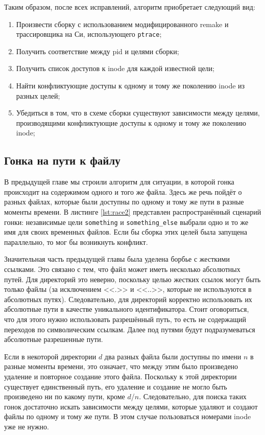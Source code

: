 Таким образом, после всех исправлений, алгоритм приобретает следующий вид:

\begin{enumerate}
	\item Произвести сборку с использованием модифицированного remake и трассировщика на Си, использующего \texttt{ptrace};
	\item Получить соответствие между pid и целями сборки;
	\item Получить список доступов к inode для каждой известной цели;
	\item Найти конфликтующие доступы к одному и тому же поколению inode из разных целей;
	\item Убедиться в том, что в схеме сборки существуют зависимости между целями, производящими конфликтующие доступы к одному и тому же поколению inode;
\end{enumerate}

\subsection{Гонка на пути к файлу}



В предыдущей главе мы строили алгоритм для ситуации, в которой гонка происходит на содержимом одного и того же файла. Здесь же речь пойдёт о разных файлах, которые были доступны по одному и тому же пути в разные моменты времени. В листинге \ref{lst:race2} представлен распространённый сценарий гонки: независимые цели \texttt{something} и \texttt{something\_else} выбрали одно и то же имя для своих временных файлов. Если бы сборка этих целей была запущена параллельно, то мог бы возникнуть конфликт.

Значительная часть предыдущей главы была уделена борбье с жесткими ссылками. Это связано с тем, что файл может иметь несколько абсолютных путей. Для директорий это неверно, поскольку целью жестких ссылок могут быть только файлы (за исключением <<.>> и <<..>>, которые не используются в абсолютных путях). Следовательно, для директорий корректно использовать их абсолютные пути в качестве уникального идентификатора. Стоит оговориться, что для этого нужно использовать разрешённый путь, то есть не содержащий переходов по символическим ссылкам. Далее под путями будут подразумеваться абсолютные разрешенные пути.

Если в некоторой директории $d$ два разных файла были доступны по имени $n$ в разные моменты времени, это означает, что между этим было произведено удаление и повторное создание этого файла. Поскольку к этой директории существует единственный путь, его удаление и создание не могло быть произведено ни по какому пути, кроме $d$/$n$. Следовательно, для поиска таких гонок достаточно искать зависимости между целями, которые удаляют и создают файлы по одному и тому же пути. В этом случае пользоваться номерами inode уже не нужно.

